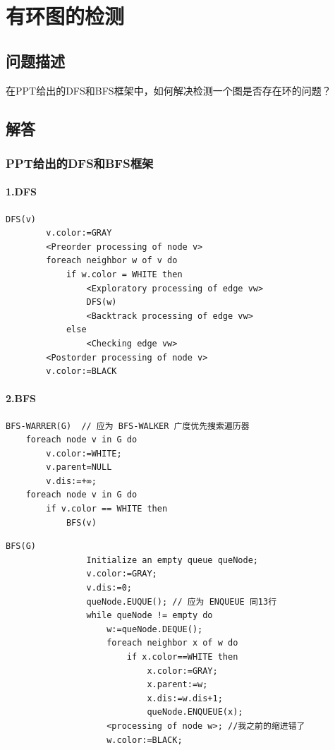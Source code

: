\documentclass{article}
\begin{document}
\section{有环图的检测}
\subsection{问题描述}

在PPT给出的DFS和BFS框架中，如何解决检测一个图是否存在环的问题？


\subsection{解答}

\pagebreak

\subsubsection{PPT给出的DFS和BFS框架}

\paragraph{1.DFS}
\begin{lstlisting}[style=algorithmPPT]
    DFS(v)
        v.color:=GRAY
        <Preorder processing of node v>
        foreach neighbor w of v do
            if w.color = WHITE then
                <Exploratory processing of edge vw>
                DFS(w)
                <Backtrack processing of edge vw>
            else
                <Checking edge vw>
        <Postorder processing of node v>
        v.color:=BLACK
    \end{lstlisting}

\paragraph{2.BFS}
\begin{lstlisting}[style=algorithmPPT]
    BFS-WARRER(G)  // 应为 BFS-WALKER 广度优先搜索遍历器
    foreach node v in G do
        v.color:=WHITE; 
        v.parent=NULL 
        v.dis:=+∞;
    foreach node v in G do
        if v.color == WHITE then
            BFS(v)
\end{lstlisting}

\begin{lstlisting}[style=algorithmPPT]
            BFS(G)
                Initialize an empty queue queNode;
                v.color:=GRAY;
                v.dis:=0;
                queNode.EUQUE(); // 应为 ENQUEUE 同13行
                while queNode != empty do
                    w:=queNode.DEQUE();
                    foreach neighbor x of w do
                        if x.color==WHITE then
                            x.color:=GRAY;
                            x.parent:=w;
                            x.dis:=w.dis+1;
                            queNode.ENQUEUE(x);
                    <processing of node w>; //我之前的缩进错了
                    w.color:=BLACK;
\end{lstlisting}
\end{document}
